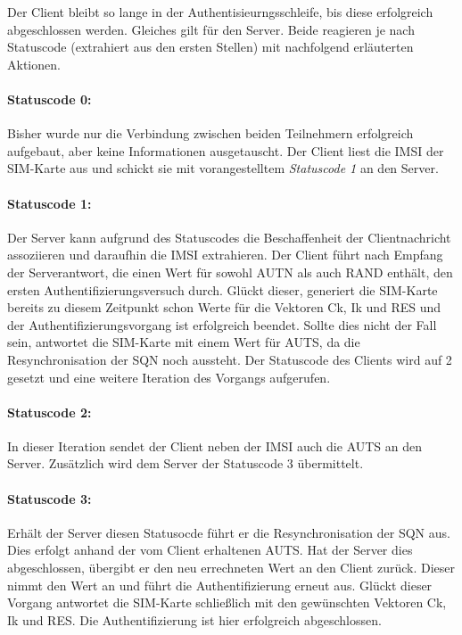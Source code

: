     Der Client bleibt so lange in der Authentisieurngsschleife, bis diese erfolgreich abgeschlossen werden.
    Gleiches gilt für den Server. Beide reagieren je nach Statuscode (extrahiert aus den ersten Stellen)
    mit nachfolgend erläuterten Aktionen.

    \paragraph{Statuscode 0:} Bisher wurde nur die Verbindung zwischen beiden Teilnehmern erfolgreich aufgebaut,
    aber keine Informationen ausgetauscht. Der Client liest die IMSI der SIM-Karte aus und schickt sie mit
    vorangestelltem \textit{Statuscode 1} an den Server.

    \paragraph{Statuscode 1:} Der Server kann aufgrund des Statuscodes die Beschaffenheit
    der Clientnachricht assoziieren und daraufhin die IMSI extrahieren. Der Client führt
    nach Empfang der Serverantwort, die einen Wert für sowohl AUTN als auch RAND enthält, den
    ersten Authentifizierungsversuch durch. Glückt dieser, generiert die SIM-Karte bereits zu diesem
    Zeitpunkt schon Werte für die Vektoren Ck, Ik und RES und der Authentifizierungsvorgang ist
    erfolgreich beendet. Sollte dies nicht der Fall sein, antwortet die SIM-Karte mit einem Wert für
    AUTS, da die Resynchronisation der SQN noch aussteht. Der Statuscode des Clients wird auf 2 gesetzt
    und eine weitere Iteration des Vorgangs aufgerufen.

    \paragraph{Statuscode 2:} In dieser Iteration sendet der Client neben der IMSI auch die AUTS an den
    Server. Zusätzlich wird dem Server der Statuscode 3 übermittelt.

    \paragraph{Statuscode 3:} Erhält der Server diesen Statusocde führt er die Resynchronisation der SQN
    aus. Dies erfolgt anhand der vom Client erhaltenen AUTS. Hat der Server dies abgeschlossen, übergibt er
    den neu errechneten Wert an den Client zurück. Dieser nimmt den Wert an und führt die Authentifizierung
    erneut aus. Glückt dieser Vorgang antwortet die SIM-Karte schließlich mit den gewünschten Vektoren
    Ck, Ik und RES. Die Authentifizierung ist hier erfolgreich abgeschlossen.

\clearpage
